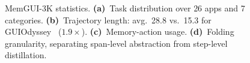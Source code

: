 \begin{figure}[h]
  \centering
  \caption{MemGUI-3K statistics. \textbf{(a)}~Task distribution over 26 apps and 7 categories. \textbf{(b)}~Trajectory length: avg.\ 28.8 vs.\ 15.3 for GUIOdyssey~\cite{lu2025guiodyssey} ($1.9\times$). \textbf{(c)}~Memory-action usage. \textbf{(d)}~Folding granularity, separating span-level abstraction from step-level distillation.}
  \label{fig:dataset-stats}
\end{figure}
